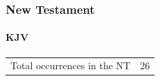 			
		
		
	\subsubsection{New Testament} %
		\label{GODLINESS-NT}
	
		\paragraph{KJV}
			\label{GODLINESS-NT-KJV}
			
	
			\begin{tabular}{ll}
				Total occurrences in the NT & 26
			\end{tabular}
			
